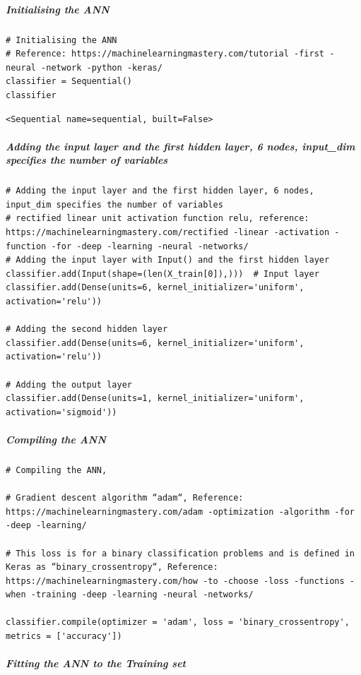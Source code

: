 \subparagraph{Initialising the ANN}

\begin{verbatim}
# Initialising the ANN
# Reference: https://machinelearningmastery.com/tutorial -first -neural -network -python -keras/
classifier = Sequential()
classifier
\end{verbatim}

\begin{verbatim}
<Sequential name=sequential, built=False>
\end{verbatim}

\subparagraph{Adding the input layer and the first hidden layer, 6 nodes, input\_dim specifies the number of variables}

\begin{verbatim}
# Adding the input layer and the first hidden layer, 6 nodes, input_dim specifies the number of variables
# rectified linear unit activation function relu, reference: https://machinelearningmastery.com/rectified -linear -activation -function -for -deep -learning -neural -networks/
# Adding the input layer with Input() and the first hidden layer
classifier.add(Input(shape=(len(X_train[0]),)))  # Input layer
classifier.add(Dense(units=6, kernel_initializer='uniform', activation='relu'))

# Adding the second hidden layer
classifier.add(Dense(units=6, kernel_initializer='uniform', activation='relu'))

# Adding the output layer
classifier.add(Dense(units=1, kernel_initializer='uniform', activation='sigmoid'))
\end{verbatim}

\subparagraph{Compiling the ANN}

\begin{verbatim}
# Compiling the ANN, 

# Gradient descent algorithm “adam“, Reference: https://machinelearningmastery.com/adam -optimization -algorithm -for -deep -learning/

# This loss is for a binary classification problems and is defined in Keras as “binary_crossentropy“, Reference: https://machinelearningmastery.com/how -to -choose -loss -functions -when -training -deep -learning -neural -networks/

classifier.compile(optimizer = 'adam', loss = 'binary_crossentropy', metrics = ['accuracy'])
\end{verbatim}

\subparagraph{Fitting the ANN to the Training set}

